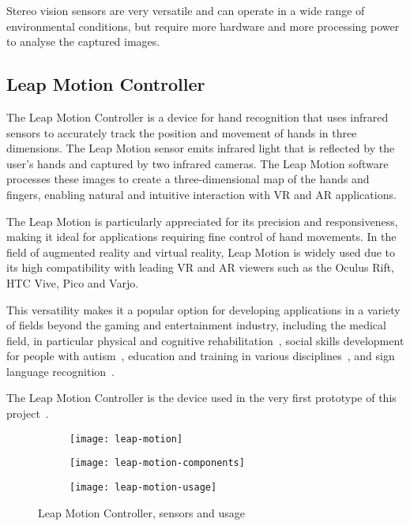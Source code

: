 Stereo vision sensors are very versatile and can operate in a wide range of environmental conditions,
but require more hardware and more processing power to analyse the captured images.

\subsection{Leap Motion Controller}\label{subsec:leap-motion-controller}
The Leap Motion Controller is a device for hand recognition that uses infrared sensors to accurately
track the position and movement of hands in three dimensions.
The Leap Motion sensor emits infrared light that is reflected by the user's hands and captured by two infrared cameras.
The Leap Motion software processes these images to create a three-dimensional map of the hands and fingers,
enabling natural and intuitive interaction with VR and AR applications.

The Leap Motion is particularly appreciated for its precision and responsiveness,
making it ideal for applications requiring fine control of hand movements.
In the field of augmented reality and virtual reality, Leap Motion is widely used due to its high compatibility with
leading VR and AR viewers such as the Oculus Rift, HTC Vive, Pico and Varjo.

This versatility makes it a popular option for developing applications in a variety of fields
beyond the gaming and entertainment industry,
including the medical field, in particular physical and cognitive rehabilitation~\cite{leap-motion-rehab-1, leap-motion-rehab-2},
social skills development for people with autism~\cite{leap-motion-autism-1, leap-motion-autism-2},
education and training in various disciplines~\cite{leap-motion-anatomy-education, leap-motion-boolean-logic-education,
	leap-motion-music-education, leap-motion-medical-education},
and sign language recognition~\cite{leap-motion-sign-language-1, leap-motion-sign-language-2}.

The Leap Motion Controller is the device used in the very first prototype of this project~\cite{keyrtual}.

\begin{figure}[ht]
	\begin{subfigure}{.3\textwidth}
		\center
		\texttt{[image: leap-motion]}
	\end{subfigure}
	\begin{subfigure}{.3\textwidth}
		\center
		\texttt{[image: leap-motion-components]}
	\end{subfigure}
	\begin{subfigure}{.3\textwidth}
		\center
		\texttt{[image: leap-motion-usage]}
	\end{subfigure}
	\caption{Leap Motion Controller, sensors \protect\cite{leap-motion-components-image} and usage}
	\label{fig:leap-motion-components}
\end{figure}

